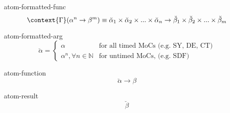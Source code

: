 \documentclass[preview]{standalone}
\begin{document}

\begin{docimage}{atom-formatted-func}
  \begin{equation*}%
    \context{\Gamma}
    (\alpha^n \rightarrow \beta^m)
    \equiv \breve{\alpha}_1 \times \breve{\alpha}_2 \times ... \times \breve{\alpha}_n
    \rightarrow \breve{\beta}_1 \times \breve{\beta}_2 \times ... \times \breve{\beta}_m
  \end{equation*}
\end{docimage} 

\begin{docimage}{atom-formatted-arg}
  \begin{equation*}
    \breve{\alpha} =
    \begin{cases}
      \alpha &  \text{for all timed MoCs (e.g. SY, DE, CT)}\\
      \alpha^n, \forall n \in \mathbb{N} & \text{for untimed MoCs, (e.g. SDF)}
    \end{cases}
  \end{equation*}
\end{docimage} 

\begin{docimage}{atom-function}
  \begin{equation*}%
    \breve{\alpha} \rightarrow \beta
  \end{equation*}
\end{docimage} 

\begin{docimage}{atom-result}
  \begin{equation*}%
    {\breve{\beta}}
  \end{equation*}
\end{docimage} 
\end{document}
